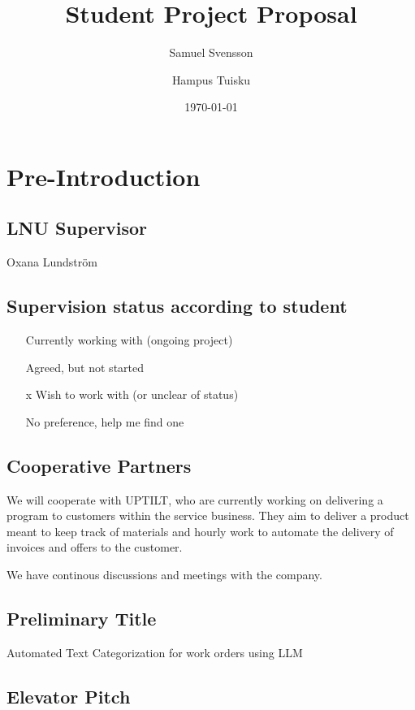 \documentclass{article}
\title{Student Project Proposal}
\author{Samuel Svensson \and Hampus Tuisku}
\date{\today}
\begin{document}
\maketitle

\section{Pre-Introduction}

\subsection{LNU Supervisor}
Oxana Lundström

\subsection{Supervision status according to student}

\begin{itemize}
      \item [ ] Currently working with (ongoing project)
      \item [ ] Agreed, but not started
      \item [x] Wish to work with (or unclear of status)
      \item [ ] No preference, help me find one
\end{itemize}

\subsection{Cooperative Partners}

We will cooperate with UPTILT, who are currently working on delivering a program
to customers within the service business.
They aim to deliver a product meant to keep track of materials and hourly work
to automate the delivery of invoices and offers to the customer.

We have continous discussions and meetings with the company.

\subsection{Preliminary Title}

Automated Text Categorization for work orders using LLM

\subsection{Elevator Pitch}
\end{document}
